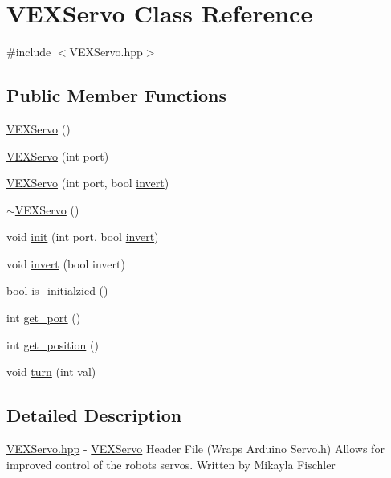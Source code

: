 \hypertarget{class_v_e_x_servo}{}\section{V\+E\+X\+Servo Class Reference}
\label{class_v_e_x_servo}


{\ttfamily \#include $<$V\+E\+X\+Servo.\+hpp$>$}

\subsection*{Public Member Functions}
\begin{DoxyCompactItemize}
\item 
\hyperlink{class_v_e_x_servo_a476b7bdb0ba79753347ed3bb9303be77}{V\+E\+X\+Servo} ()
\item 
\hyperlink{class_v_e_x_servo_ade28b71edfd878f947a63bbec722036b}{V\+E\+X\+Servo} (int port)
\item 
\hyperlink{class_v_e_x_servo_a50cbd7885996e04d3c77b61b76d2ed91}{V\+E\+X\+Servo} (int port, bool \hyperlink{class_v_e_x_servo_a9bd31afec53e4c45d264c2480b0c0e5e}{invert})
\item 
\hyperlink{class_v_e_x_servo_a9a25c4d4400daadf45b19b1fa47710ab}{$\sim$\+V\+E\+X\+Servo} ()
\item 
void \hyperlink{class_v_e_x_servo_aebc9e0de41cfb129168f5687a92c618e}{init} (int port, bool \hyperlink{class_v_e_x_servo_a9bd31afec53e4c45d264c2480b0c0e5e}{invert})
\item 
void \hyperlink{class_v_e_x_servo_a9bd31afec53e4c45d264c2480b0c0e5e}{invert} (bool invert)
\item 
bool \hyperlink{class_v_e_x_servo_ad9d2b11efe6ae96287482b0557ea4368}{is\+\_\+initialzied} ()
\item 
int \hyperlink{class_v_e_x_servo_a4db14049d3fc91aa7774a402238df12a}{get\+\_\+port} ()
\item 
int \hyperlink{class_v_e_x_servo_ae51e5e842689c31c795870019dccec58}{get\+\_\+position} ()
\item 
void \hyperlink{class_v_e_x_servo_a2de6039ce58da12f9649fe1e04dc8ea9}{turn} (int val)
\end{DoxyCompactItemize}


\subsection{Detailed Description}
\hyperlink{_v_e_x_servo_8hpp}{V\+E\+X\+Servo.\+hpp} -\/ \hyperlink{class_v_e_x_servo}{V\+E\+X\+Servo} Header File (Wraps Arduino Servo.\+h) Allows for improved control of the robot\textquotesingle{}s servos. Written by Mikayla Fischler 

